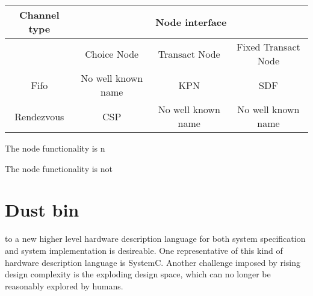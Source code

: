 \begin{tabular}{|c||c|c|c|}
\hline
 Channel type & \multicolumn{3}{c|}{ Node interface } \\
\hline
              & Choice Node         & Transact Node      & Fixed Transact Node \\
\hline \hline
 Fifo         & No well known name  & KPN                & SDF \\
\hline
 Rendezvous   & CSP                 & No well known name & No well known name \\
\hline
\end{tabular}

The node functionality is n

The node functionality is not

\clearpage
\section{Dust bin}


to a new higher level hardware description
language for both system specification and system implementation is
desireable. One representative of this kind of hardware description
language is SystemC. Another challenge imposed by rising design complexity
is the exploding design space, which can no longer be reasonably explored
by humans.


